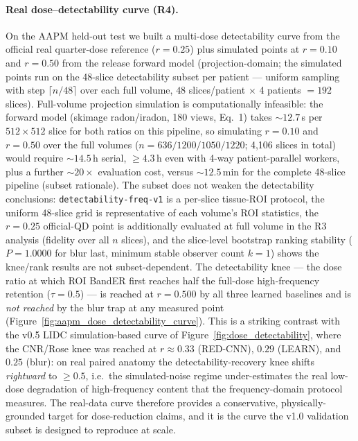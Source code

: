 \documentclass[twoside,11pt]{article}
\begin{document}
\paragraph{Real dose--detectability curve (R4).}
On the AAPM held-out test we built a multi-dose detectability curve from the official real quarter-dose reference ($r=0.25$) plus simulated points at $r=0.10$ and $r=0.50$ from the release forward model (projection-domain; the simulated points run on the 48-slice detectability subset per patient --- uniform sampling with step $\lceil n/48\rceil$ over each full volume, $48$ slices/patient $\times$ 4 patients $=192$ slices). Full-volume projection simulation is computationally infeasible: the forward model (skimage radon/iradon, 180 views, Eq.~1) takes $\sim\!12.7$\,s per $512\times512$ slice for both ratios on this pipeline, so simulating $r=0.10$ and $r=0.50$ over the full volumes ($n=636/1200/1050/1220$; 4{,}106 slices in total) would require $\sim\!14.5$\,h serial, $\geq\!4.3$\,h even with 4-way patient-parallel workers, plus a further $\sim\!20\times$ evaluation cost, versus $\sim\!12.5$\,min for the complete 48-slice pipeline (subset rationale). The subset does not weaken the detectability conclusions: \texttt{detectability-freq-v1} is a per-slice tissue-ROI protocol, the uniform 48-slice grid is representative of each volume's ROI statistics, the $r=0.25$ official-QD point is additionally evaluated at full volume in the R3 analysis (fidelity over all $n$ slices), and the slice-level bootstrap ranking stability ($P=1.0000$ for blur last, minimum stable observer count $k=1$) shows the knee/rank results are not subset-dependent. The detectability knee --- the dose ratio at which ROI BandER first reaches half the full-dose high-frequency retention ($\tau=0.5$) --- is reached at $r=0.500$ by all three learned baselines and is \emph{not reached} by the blur trap at any measured point (Figure~\ref{fig:aapm_dose_detectability_curve}). This is a striking contrast with the v0.5 LIDC simulation-based curve of Figure~\ref{fig:dose_detectability}, where the CNR/Rose knee was reached at $r\approx0.33$ (RED-CNN), $0.29$ (LEARN), and $0.25$ (blur): on real paired anatomy the detectability-recovery knee shifts \emph{rightward} to $\geq0.5$, i.e.\ the simulated-noise regime under-estimates the real low-dose degradation of high-frequency content that the frequency-domain protocol measures. The real-data curve therefore provides a conservative, physically-grounded target for dose-reduction claims, and it is the curve the v1.0 validation subset is designed to reproduce at scale.
\end{document}
